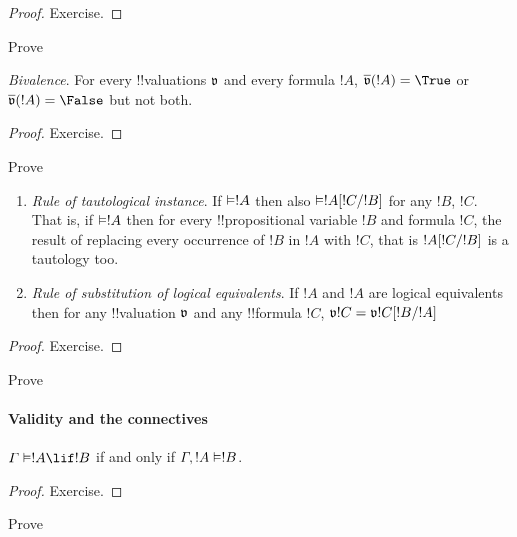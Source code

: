 \documentclass[../../../include/open-logic-section]{subfiles}
\begin{document}
\begin{proof}
Exercise.
\end{proof}

\begin{prob}
Prove 
\end{prob}

\begin{prop}
 \emph{Bivalence}. For every !!{valuation}s $\pAssign{v}$ and every formula $!A$, $\pValue{v}(!A)=\True$ or $\pValue{v}(!A)=\False$ but not both.
\end{prop}

\begin{proof}
Exercise.
\end{proof}

\begin{prob}
Prove 
\end{prob}

\begin{prop}
\begin{enumerate}
  \item \emph{Rule of tautological instance}. If $\Entails !A$ then also $\Entails \Subst{!A}{!C}{!B}$ for any $!B$, $!C$. That is, if $\Entails !A$ then for every !!{propositional variable} $!B$ and formula $!C$, the result of replacing every occurrence of $!B$ in $!A$ with $!C$, that is $!A[!C/!B]$ is a tautology too.
  \item \emph{Rule of substitution of logical equivalents}. If $!A$ and $!A$ are logical equivalents then for any !!{valuation} $\pAssign{v}$ and any !!{formula} $!C$, $\pAssign{v}{!C}=\pAssign{v}{\Subst{!C}{!B}{!A}}$
\end{enumerate}
\end{prop}

\begin{proof}
Exercise.
\end{proof}

\begin{prob}
Prove 
\end{prob}

\paragraph*{Validity and the connectives}

\begin{thm}
   $\Gamma \Entails !A \lif !B$ if and only
  if $\Gamma, !A \Entails !B$.
\end{thm}

\begin{proof}
Exercise.
\end{proof}

\begin{prob}
Prove 
\end{prob}
\end{document}
